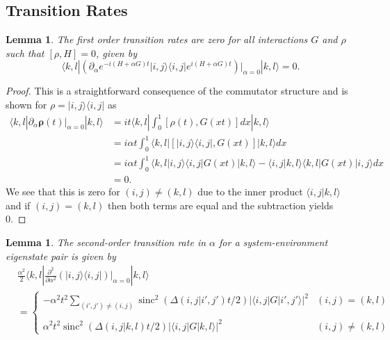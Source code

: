 \documentclass[
 amsmath,amssymb,
 aps,
onecolumn, 
nofootinbib]{revtex4-2}
\newtheorem{lemma}[theorem]{Lemma}
\newcommand{\ket}[1]{|#1\rangle}
\newcommand{\bra}[1]{\langle #1|}
\newcommand{\braket}[2]{\langle #1|#2\rangle}
\newcommand{\ketbra}[2]{| #1\rangle\! \langle #2|}
\newcommand{\abs}[1]{\left| #1 \right|}
\DeclareMathOperator{\sinc}{sinc}
\begin{document}
\subsection{Transition Rates} \label{sec:transtion_rates}
\begin{lemma} \label{lem:first_order_phi}
    The first order transition rates are zero for all interactions $G$ and $\rho$ such that $[\rho, H] =0$, given by
    \begin{equation}
         \bra{k,l} \left(\partial_\alpha e^{-i (H + \alpha G)t} \ketbra{i,j}{i,j} e^{i (H + \alpha G )t} \right) \bigg|_{\alpha = 0}  \ket{k,l} = 0.
    \end{equation}
\end{lemma}
\begin{proof}
    This is a straightforward consequence of the commutator structure and is shown for $\rho = \ketbra{i,j}{i,j}$ as
    \begin{align}
    \bra{k,l} \partial_\alpha \boldsymbol{\rho}(t)\big|_{\alpha = 0} \ket{k,l} &= i  t \bra{k,l} \int_0^1 [\rho(t), G(x t)] d x \ket{k,l} \\
          &= i \alpha t \int_0^1 \bra{k,l}[\ketbra{i,j}{i,j},G(xt)] \ket{k,l} dx \\
        &= i \alpha t \int_0^1 \braket{k,l}{i,j} \bra{i,j}G(xt) \ket{k,l} - \braket{i,j}{k,l} \bra{k,l}G(xt) \ket{i,j} dx \\
        &= 0.
    \end{align}
    We see that this is zero for $(i,j) \neq (k,l)$ due to the inner product $\braket{i,j}{k,l}$ and if $(i,j) = (k,l)$ then both terms are equal and the subtraction yields 0.
\end{proof}

\begin{lemma} \label{lem:second_order_rates_final}
    The second-order transition rate in $\alpha$ for a system-environment eigenstate pair is given by
    \begin{align}
         &\frac{\alpha^2}{2}\bra{k,l} \frac{\partial^2}{\partial \alpha^2}(\ketbra{i,j}{i,j} )\bigg|_{\alpha = 0} \ket{k,l} 
        \nonumber \\
        &= \begin{cases}
             - \alpha^2 t^2 \sum_{(i',j') \neq (i,j)} \sinc^2 \left( \Delta(i,j| i', j') t / 2\right) \abs{\bra{i,j} G \ket{i',j'}}^2 & (i,j) = (k,l) \\
             \\
            \alpha^2 t^2  \sinc^2 \left( \Delta(i,j| k,l) t / 2\right) \abs{\bra{i,j} G \ket{k,l}}^2 & (i,j) \neq (k,l)
        \end{cases}
    \end{align}
\end{lemma}
\end{document}
